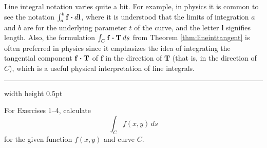 Line integral notation varies quite a bit. For example, in physics it is common to see the notation
$\int_a^b \mathbf{f} \bm{\cdot} d\mathbf{l}$, where it is understood that the limits of integration $a$ and $b$ are for
the underlying parameter $t$ of the curve, and the letter $\mathbf{l}$ signifies length. Also, the formulation
$\int_C \mathbf{f} \bm{\cdot} \mathbf{T}\,ds$ from Theorem \ref{thm:lineinttangent} is often preferred in physics since
it emphasizes the idea of integrating the tangential component $\mathbf{f} \bm{\cdot} \mathbf{T}$ of $\mathbf{f}$ in the
direction of $\mathbf{T}$ 
(that is, in the direction of $C$), 
which is a useful physical interpretation of line integrals.
\hrule width \textwidth height 0.5pt
\medskip
\centerline{}\label{sec4dot1}
\par\noindent For Exercises 1--4, calculate 
\[\int_C f(x,y)\,ds\] for the given function $f(x,y)$ and
curve $C$.

